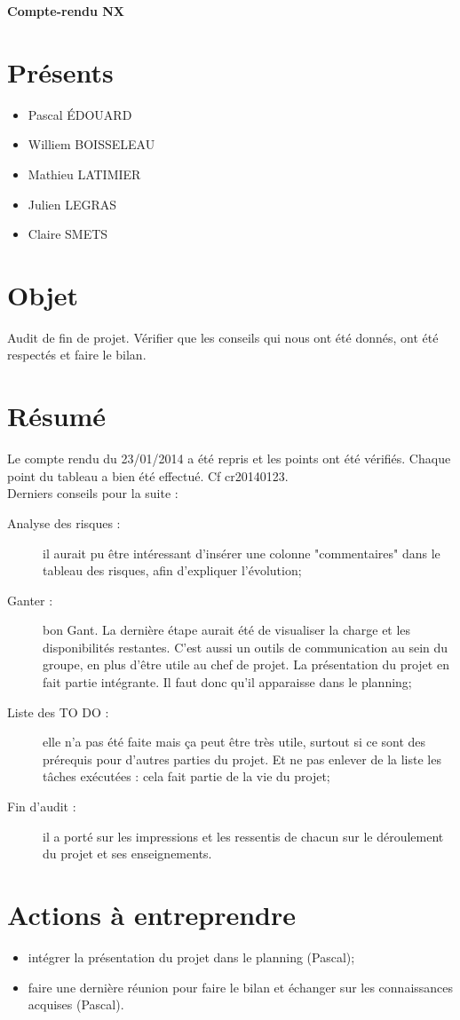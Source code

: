 \documentclass[a4paper,11pt,french]{article}
\author{\hmwkAuthorName}
\date{21/02/2013} %
\newcommand{\hmwkDocName}{Compte-rendu N\degree X} %
\begin{document}
\pagestyle{fancy}

\begin{center}\textbf{\Huge{\hmwkDocName}}\end{center}
	
\section{Présents}
\begin{itemize}
	\item Pascal ÉDOUARD
	\item Williem BOISSELEAU
	\item Mathieu LATIMIER
	\item Julien LEGRAS
	\item Claire SMETS
\end{itemize}

\section{Objet}
Audit de fin de projet. Vérifier que les conseils qui nous ont été donnés, ont été respectés et faire le bilan.

\section{Résumé}

Le compte rendu du 23/01/2014 a été repris et les points ont été vérifiés. Chaque point du tableau a bien été effectué. Cf cr20140123.\\
Derniers conseils pour la suite : 
\begin{description}
	\item [Analyse des risques : ] il aurait pu être intéressant d'insérer une colonne "commentaires" dans le tableau des risques, afin d'expliquer l'évolution;
	\item [Ganter : ] bon Gant. La dernière étape aurait été de visualiser la charge et les disponibilités restantes. C'est aussi un outils de communication au sein du groupe, en plus d'être utile au chef de projet. La présentation du projet en fait partie intégrante. Il faut donc qu'il apparaisse dans le planning;
	\item [Liste des TO DO : ] elle n'a pas été faite mais ça peut être très utile, surtout si ce sont des prérequis pour d'autres parties du projet. Et ne pas enlever de la liste les tâches exécutées : cela fait partie de la vie du projet;
	\item [Fin d'audit : ] il a porté sur les impressions et les ressentis de chacun sur le déroulement du projet et ses enseignements.\\
\end{description}

\section{Actions à entreprendre}
\begin{itemize}
	\item intégrer la présentation du projet dans le planning (Pascal);
	\item faire une dernière réunion pour faire le bilan et échanger sur les connaissances acquises (Pascal).\\
\end{itemize}
\end{document}
